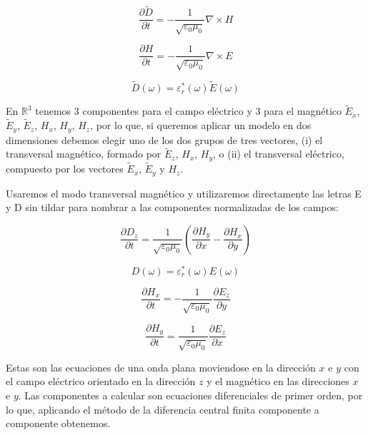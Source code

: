 \documentclass[11pt,a4paper,twoside,pdf]{article}
\numberwithin{equation}{section}
\begin{document}
\begin{equation}
\frac{\partial \tilde{D}}{\partial t}=-\frac{1}{\sqrt{\varepsilon_{0}\mu_{0}}}\nabla \times H
\end{equation}

\begin{equation}
\frac{\partial H}{\partial t}=-\frac{1}{\sqrt{\varepsilon_{0}\mu_{0}}}\nabla \times E
\end{equation}

\begin{equation}
\tilde{D}(\omega)=\varepsilon^*_{r}(\omega)\tilde{E}(\omega)
\end{equation}


En $\mathbb R^{3}$ tenemos 3 componentes para el campo eléctrico y 3 para el magnético $\tilde{E}_{x}$, $\tilde{E}_{y}$, $\tilde{E}_{z}$, $H_{x}$, $H_{y}$, $H_{z}$, por lo que, si queremos aplicar un modelo en dos dimensiones debemos elegir uno de los dos grupos de tres vectores, (i) el transversal magnético, formado por $\tilde{E}_{z}$, $H_{x}$, $H_{y}$, o (ii) el transversal eléctrico, compuesto por los vectores $\tilde{E}_{x}$, $\tilde{E}_{y}$ y $H_{z}$.

Usaremos el modo transversal magnético y utilizaremos directamente las letras E y D sin tildar para nombrar a las componentes normalizadas de los campos:

\begin{equation}
\frac{\partial D_{z}}{\partial t}=\frac{1}{\sqrt{\varepsilon_{0}\mu_{0}}}(\frac{\partial H_{y}}{\partial x}-\frac{\partial H_{x}}{\partial y})
\end{equation}

\begin{equation}
{D}(\omega)=\varepsilon^*_{r}(\omega)E(\omega)
\end{equation}

\begin{equation}
\frac{\partial H_{x}}{\partial t}=-\frac{1}{\sqrt{\varepsilon_{0}\mu_{0}}}\frac{\partial E_{z}}{\partial y}
\end{equation}

\begin{equation}
\frac{\partial H_{y}}{\partial t}=\frac{1}{\sqrt{\varepsilon_{0}\mu_{0}}}\frac{\partial E_{z}}{\partial x}
\end{equation}

Estas son las ecuaciones de una onda plana moviendose en la dirección $x$ e $y$ con el campo eléctrico orientado en la dirección $z$ y el magnético en las direcciones $x$ e $y$. Las componentes a calcular son ecuaciones diferenciales de primer orden, por lo que, aplicando el método de la diferencia central finita componente a componente obtenemos.
\end{document}
